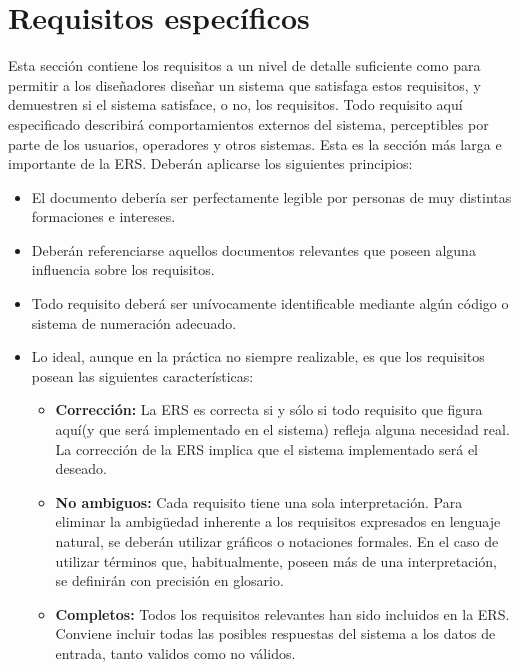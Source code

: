 \documentclass[12pt,a4paper, twosite]{article}
\begin{document}
\section{Requisitos específicos}
\label{sec:org40573d1}

Esta sección contiene los requisitos a un nivel de detalle suficiente
como para permitir a los diseñadores diseñar un sistema que
satisfaga estos requisitos, y demuestren si el sistema satisface, o
no, los requisitos. Todo requisito aquí especificado describirá
comportamientos externos del sistema, perceptibles por parte de los
usuarios, operadores y otros sistemas. Esta es la sección más larga
e importante de la ERS. Deberán aplicarse los siguientes principios:

\begin{itemize}
\item El documento debería ser perfectamente legible por personas de muy
distintas formaciones e intereses.

\item Deberán referenciarse aquellos documentos relevantes que poseen
alguna influencia sobre los requisitos.

\item Todo requisito deberá ser unívocamente identificable mediante algún
código o sistema de numeración adecuado.

\item Lo ideal, aunque en la práctica no siempre realizable, es que los
requisitos posean las siguientes características: 

\begin{itemize}
\item \textbf{Corrección:} La ERS es correcta si y sólo si todo requisito que
figura aquí(y que será implementado en el sistema) refleja alguna
necesidad real. La corrección de la ERS implica que el sistema
implementado será el deseado.

\item \textbf{No ambiguos:} Cada requisito tiene una sola interpretación. Para
eliminar la ambigüedad inherente a los requisitos expresados en
lenguaje natural, se deberán utilizar gráficos o notaciones
formales. En el caso de utilizar términos que, habitualmente,
poseen más de una interpretación, se definirán con precisión en
glosario.

\item \textbf{Completos:} Todos los requisitos relevantes han sido incluidos en
la ERS. Conviene incluir todas las posibles respuestas del sistema
a los datos de entrada, tanto validos como no válidos.


\end{itemize}
\end{itemize}
\end{document}
